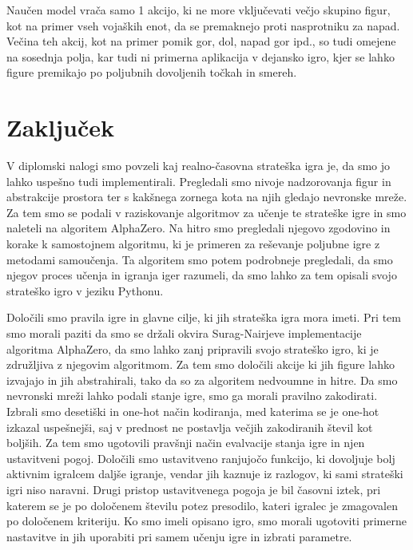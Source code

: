 \documentclass[a4paper, 12pt]{book}
\begin{document}
Naučen model vrača samo 1 akcijo, ki ne more vključevati večjo skupino figur, kot na primer vseh vojaških enot, da se premaknejo proti nasprotniku za napad.
Večina teh akcij, kot na primer pomik gor, dol, napad gor ipd., so tudi omejene na sosednja polja, kar tudi ni primerna aplikacija v dejansko igro, kjer se lahko figure premikajo po poljubnih dovoljenih točkah in smereh.


\chapter{Zaključek}
\label{chzakljucek}
V diplomski nalogi smo povzeli kaj realno-časovna strateška igra je, da smo jo lahko uspešno tudi implementirali.
Pregledali smo nivoje nadzorovanja figur in abstrakcije prostora ter s kakšnega zornega kota na njih gledajo nevronske mreže.
Za tem smo se podali v raziskovanje algoritmov za učenje te strateške igre in smo naleteli na algoritem AlphaZero.
Na hitro smo pregledali njegovo zgodovino in korake k samostojnem algoritmu, ki je primeren za reševanje poljubne igre z metodami samoučenja.
Ta algoritem smo potem podrobneje pregledali, da smo njegov proces učenja in igranja iger razumeli, da smo lahko za tem opisali svojo strateško igro v jeziku Pythonu.

Določili smo pravila igre in glavne cilje, ki jih strateška igra mora imeti.
Pri tem smo morali paziti da smo se držali okvira Surag-Nairjeve implementacije algoritma AlphaZero, da smo lahko zanj pripravili svojo strateško igro, ki je združljiva z njegovim algoritmom.
Za tem smo določili akcije ki jih figure lahko izvajajo in jih abstrahirali, tako da so za algoritem nedvoumne in hitre.
Da smo nevronski mreži lahko podali stanje igre, smo ga morali pravilno zakodirati.
Izbrali smo desetiški in one-hot način kodiranja, med katerima se je one-hot izkazal uspešnejši, saj v prednost ne postavlja večjih zakodiranih števil kot boljših.
Za tem smo ugotovili pravšnji način evalvacije stanja igre in njen ustavitveni pogoj.
Določili smo ustavitveno ranjujočo funkcijo, ki dovoljuje bolj aktivnim igralcem daljše igranje, vendar jih kaznuje iz razlogov, ki sami strateški igri niso naravni.
Drugi pristop ustavitvenega pogoja je bil časovni iztek, pri katerem se je po določenem številu potez presodilo, kateri igralec je zmagovalen po določenem kriteriju.
Ko smo imeli opisano igro, smo morali ugotoviti primerne nastavitve in jih uporabiti pri samem učenju igre in izbrati parametre.
\end{document}

